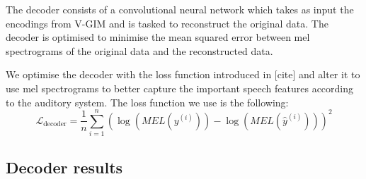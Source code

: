 	
	
		The decoder consists of a convolutional neural network which takes as input the encodings from V-GIM and is tasked to reconstruct the original data. The decoder is optimised to minimise the mean squared error between mel spectrograms of the original data and the reconstructed data. 
		
		We optimise the decoder with the loss function introduced in [cite] and alter it to use mel spectrograms to better capture the important speech features according to the auditory system. The loss function we use is the following:
		$$
		\mathcal{L}_{\text{decoder}} =\frac{1}{n} \sum_{i=1}^n\left( \log (MEL(y^{(i)})) -\log (MEL(\hat{y} ^{(i)} )) \right)^2
		$$
		
		
		\subsection{Decoder results}
		
		
		
	
	
	
	
	
%	
%	
%	
%	
%	
%	
%	
	
	
	


%
%
%
%


